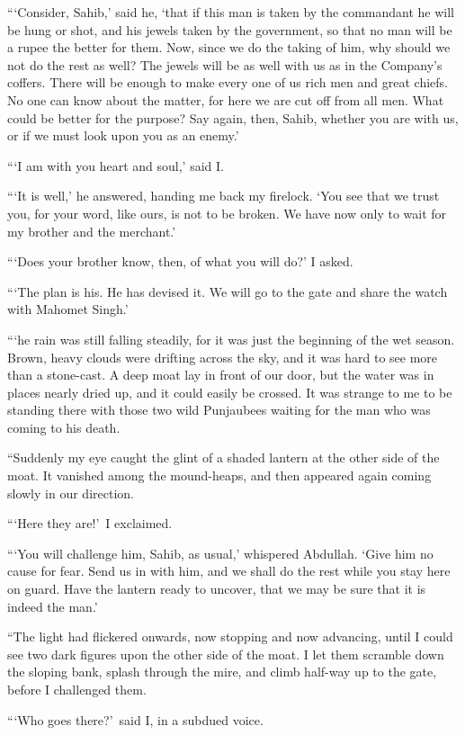 \documentclass[12pt,english,oneside]{book}
\begin{document}
{}```Consider, Sahib,' said he, `that if this man is taken by the
commandant he will be hung or shot, and his jewels taken by the government,
so that no man will be a rupee the better for them. Now, since we
do the taking of him, why should we not do the rest as well? The jewels
will be as well with us as in the Company's coffers. There will be
enough to make every one of us rich men and great chiefs. No one can
know about the matter, for here we are cut off from all men. What
could be better for the purpose? Say again, then, Sahib, whether you
are with us, or if we must look upon you as an enemy.'

{}```I am with you heart and soul,' said I.

{}```It is well,' he answered, handing me back my firelock. `You
see that we trust you, for your word, like ours, is not to be broken.
We have now only to wait for my brother and the merchant.'

{}```Does your brother know, then, of what you will do?' I asked.

{}```The plan is his. He has devised it. We will go to the gate and
share the watch with Mahomet Singh.'

{}```he rain was still falling steadily, for it was just the beginning
of the wet season. Brown, heavy clouds were drifting across the sky,
and it was hard to see more than a stone-cast. A deep moat lay in
front of our door, but the water was in places nearly dried up, and
it could easily be crossed. It was strange to me to be standing there
with those two wild Punjaubees waiting for the man who was coming
to his death.

{}``Suddenly my eye caught the glint of a shaded lantern at the other
side of the moat. It vanished among the mound-heaps, and then appeared
again coming slowly in our direction.

{}```Here they are!'\ I exclaimed.

{}```You will challenge him, Sahib, as usual,' whispered Abdullah.
`Give him no cause for fear. Send us in with him, and we shall do
the rest while you stay here on guard. Have the lantern ready to uncover,
that we may be sure that it is indeed the man.'

{}``The light had flickered onwards, now stopping and now advancing,
until I could see two dark figures upon the other side of the moat.
I let them scramble down the sloping bank, splash through the mire,
and climb half-way up to the gate, before I challenged them.

{}```Who goes there?'\ said I, in a subdued voice.
\end{document}
